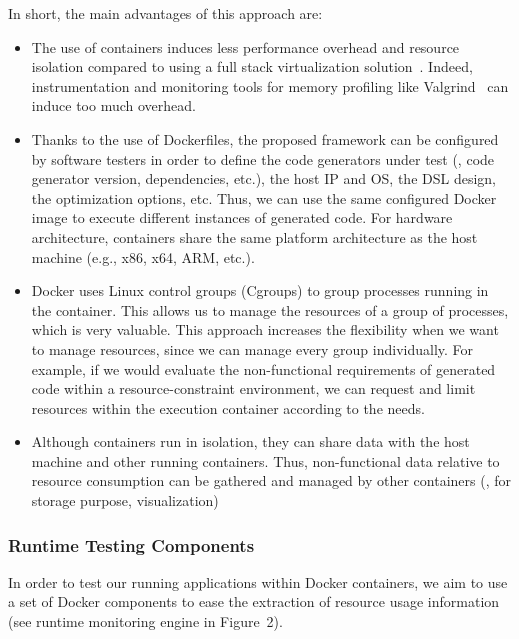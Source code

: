 In short, the main advantages of this approach are:
\begin{itemize}
	\item The use of containers induces less performance overhead and resource isolation compared to using a full stack virtualization solution~\cite{spoiala2016performance}. Indeed, instrumentation and monitoring tools for memory profiling like Valgrind~\cite{nethercote2007valgrind} can induce too much overhead.
	\item Thanks to the use of Dockerfiles, the proposed framework can be  configured by software testers in order to define the code generators under test (\eg, code generator version, dependencies, etc.), the host IP and OS, the DSL design, the optimization options, etc. Thus, we can use the same configured Docker image to execute different instances of generated code. For hardware architecture, containers share the same platform architecture as the host machine (e.g., x86, x64, ARM, etc.). 
	\item Docker uses Linux control groups (Cgroups) to group processes running in the container. This allows us to manage the resources of a group of processes, which is very valuable. 
	This approach increases the flexibility when we want to manage resources, since we can manage every group individually. For example, if we would evaluate the non-functional requirements of generated code within a resource-constraint environment, we can  request and limit resources within the execution container according to the needs.
	\item Although containers run in isolation, they can share data with the host machine and other running containers. Thus, non-functional data relative to resource consumption can be gathered and managed by other containers (\ie, for storage purpose, visualization)
\end{itemize}




\subsubsection{Runtime Testing Components}
In order to test our running applications within Docker containers, we aim to use a set of Docker components to ease the extraction of resource usage information (see runtime monitoring engine in Figure~2).
